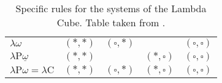 \documentclass[12pt,toc=bibliography,numbers=noendperiod,
               footnotes=multiple,twoside]{scrartcl}
\begin{document}
\begin{enumerate}
\begin{table}[h]
\begin{tabular}{l l l l l}
        \(\lambda\omega\) & \((*,*)\) & \((\square, *)\) & & \((\square, \square)\) \\

        \(\lambda\textrm{P}\underline{\omega}\) & \((*,*)\) & & \((*,\square)\) & \((\square, \square)\) \\

        \(\lambda\textrm{P}\omega = \lambda\textrm{C}\) & \((*,*)\) & \((\square, *)\) & \((*,\square)\) & \((\square, \square)\) \\

        \bottomrule
    \end{tabular}
    \caption{Specific rules for the systems of the Lambda Cube. Table taken from \textcite[205]{barendregt_lambda_1992}.}
    \label{tab:lambda-cube-s-rules}
\end{table}
\end{enumerate}
\end{document}
